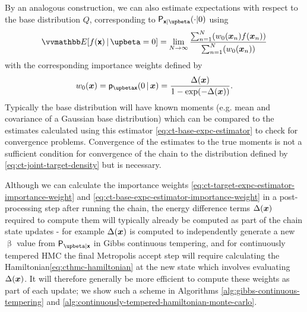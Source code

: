 By an analogous construction, we can also estimate expectations with respect to the base distribution $Q$, corresponding to $\prob{\rvct{x}|\upbeta}(\cdot|0)$ using
\begin{equation}\label{eq:ct-base-expc-estimator}
\expc{f(\rvct{x})\gvn\upbeta=0}
= \lim_{N \to \infty}
\frac
{\sum_{n=1}^N \lpa w_0\lpa \vct{x}_n\rpa f\lpa\vct{x}_n\rpa\rpa}
{\sum_{n=1}^N\lpa w_0\lpa \vct{x}_n\rpa \rpa}
\end{equation}
with the corresponding importance weights defined by
\begin{equation}\label{eq:ct-base-expc-estimator-importance-weight}
w_0(\vct{x}) = \pden{\upbeta \rvct{x}}(0 \gvn \vct{x}) = \frac{\Delta(\vct{x})}{1 - \exp\lpa - \Delta(\vct{x})\rpa}.
\end{equation}
Typically the base distribution will have known moments (e.g. mean and covariance of a Gaussian base distribution) which can be compared to the estimates calculated using this estimator \eqref{eq:ct-base-expc-estimator} to check for convergence problems. Convergence of the estimates to the true moments is not a sufficient condition for convergence of the chain to the distribution defined by \eqref{eq:ct-joint-target-density} but is necessary.

Although we can calculate the importance weights \eqref{eq:ct-target-expc-estimator-importance-weight} and \eqref{eq:ct-base-expc-estimator-importance-weight} in a post-processing step after running the chain, the energy difference terms $\Delta(\boldsymbol{x})$ required to compute them will typically already be computed as part of the chain state updates - for example $\Delta(\boldsymbol{x})$ is computed to independently generate a new $\upbeta$ value from $\prob{\upbeta|\rvct{x}}$ in Gibbs continuous tempering, and for continuously tempered \ac{HMC} the final Metropolis accept step will require calculating the Hamiltonian\eqref{eq:cthmc-hamiltonian} at the new state which involves evaluating $\Delta(\boldsymbol{x})$. It will therefore generally be more efficient to compute these weights as part of each update; we show such a scheme in Algorithms \ref{alg:gibbs-continuous-tempering} and \ref{alg:continuously-tempered-hamiltonian-monte-carlo}.

